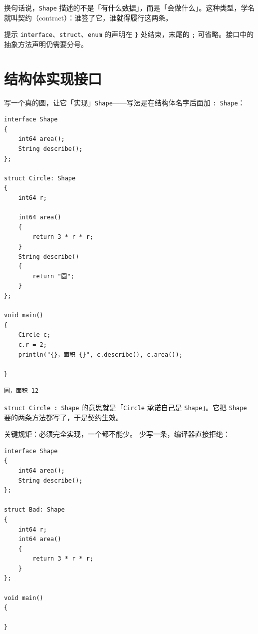 换句话说，\texttt{Shape} 描述的不是「有什么数据」，而是「会做什么」。这种类型，学名就叫契约（contract）：谁签了它，谁就得履行这两条。

\begin{tip}{提示}
\texttt{interface}、\texttt{struct}、\texttt{enum} 的声明在 \texttt{\}} 处结束，末尾的 \texttt{;} 可省略。接口中的抽象方法声明仍需要分号。
\end{tip}

\section{结构体实现接口}

写一个真的圆，让它「实现」\texttt{Shape}——写法是在结构体名字后面加 \texttt{:\allowbreak{} Shape}：

\par
\medskip
\begin{lstlisting}[style=chali]
interface Shape
{
    int64 area();
    String describe();
};

struct Circle: Shape
{
    int64 r;

    int64 area()
    {
        return 3 * r * r;
    }
    String describe()
    {
        return "圆";
    }
};

void main()
{
    Circle c;
    c.r = 2;
    println("{}，面积 {}", c.describe(), c.area());

}
\end{lstlisting}
\par
\medskip

\par
\medskip
\begin{lstlisting}[style=out]
圆，面积 12
\end{lstlisting}
\par
\medskip

\texttt{struct Circle :\allowbreak{} Shape} 的意思就是「\texttt{Circle} 承诺自己是 \texttt{Shape}」。它把 \texttt{Shape} 要的两条方法都写了，于是契约生效。

关键规矩：必须完全实现，一个都不能少。 少写一条，编译器直接拒绝：

\par
\medskip
\begin{lstlisting}[style=chali]
interface Shape
{
    int64 area();
    String describe();
};

struct Bad: Shape
{
    int64 r;
    int64 area()
    {
        return 3 * r * r;
    }
};

void main()
{

}
\end{lstlisting}
\par
\medskip

